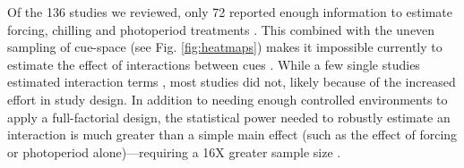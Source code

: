 \documentclass[11pt,letter]{article}
\begin{document}
Of the 136 studies we reviewed, only 72 reported enough information to estimate forcing, chilling and photoperiod treatments \citep{ettinger2020}. This combined with the uneven sampling of cue-space (see Fig. \ref{fig:heatmaps}) makes it impossible currently to estimate the effect of interactions between cues \citep{ettinger2020}. While a few single studies estimated interaction terms \citep[e.g.,][]{zohner2014}, most studies did not, likely because of the increased effort in study design. In addition to needing enough controlled environments to apply a full-factorial design, the statistical power needed to robustly estimate an interaction is much greater than a simple main effect (such as the effect of forcing or photoperiod alone)---requiring a 16X greater sample size \citep{regotherstories}.\\ 

\end{document}
